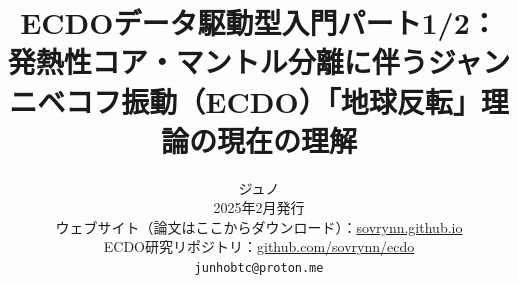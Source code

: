 \documentclass[10pt,twocolumn,letterpaper]{article}
\begin{document}
\title{ECDOデータ駆動型入門パート1/2：発熱性コア・マントル分離に伴うジャンニベコフ振動（ECDO）「地球反転」理論の現在の理解}

\author{ジュノ\\
2025年2月発行\\
ウェブサイト（論文はここからダウンロード）：\href{https://sovrynn.github.io}{sovrynn.github.io}\\
ECDO研究リポジトリ：\href{https://github.com/sovrynn/ecdo}{github.com/sovrynn/ecdo}\\
{\tt\small junhobtc@proton.me}
}

\maketitle
\end{document}
